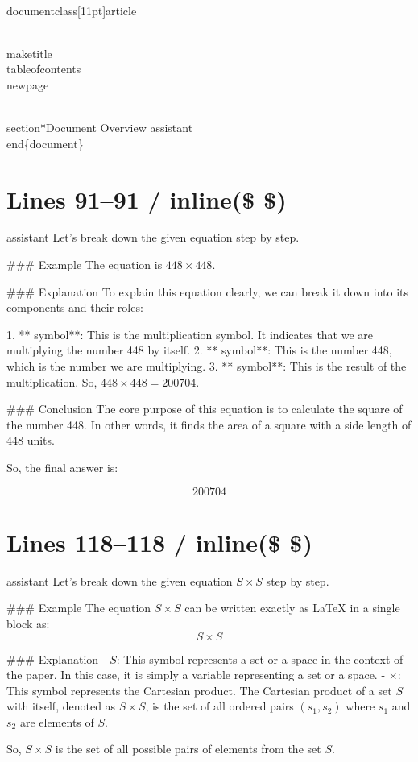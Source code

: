 \\documentclass[11pt]{article}
\begin{document}
\\maketitle
\\tableofcontents
\\newpage

\\section*{Document Overview}
assistant
\\end\{document\}

\newpage

\section*{Lines 91–91 / inline(\$ \$) }
assistant
Let's break down the given equation step by step.

### Example
The equation is \(448 \times 448\).

### Explanation
To explain this equation clearly, we can break it down into its components and their roles:

1. ** symbol**: This is the multiplication symbol. It indicates that we are multiplying the number 448 by itself.
2. ** symbol**: This is the number 448, which is the number we are multiplying.
3. ** symbol**: This is the result of the multiplication. So, \(448 \times 448 = 200704\).

### Conclusion
The core purpose of this equation is to calculate the square of the number 448. In other words, it finds the area of a square with a side length of 448 units.

So, the final answer is:

\[
\boxed{200704}
\]


\section*{Lines 118–118 / inline(\$ \$) }
assistant
Let's break down the given equation \( S \times S \) step by step.

### Example
The equation \( S \times S \) can be written exactly as LaTeX in a single block as:
\[ S \times S \]

### Explanation
- \( S \): This symbol represents a set or a space in the context of the paper. In this case, it is simply a variable representing a set or a space.
- \( \times \): This symbol represents the Cartesian product. The Cartesian product of a set \( S \) with itself, denoted as \( S \times S \), is the set of all ordered pairs \((s_1, s_2)\) where \( s_1 \) and \( s_2 \) are elements of \( S \).

So, \( S \times S \) is the set of all possible pairs of elements from the set \( S \).
\end{document}
